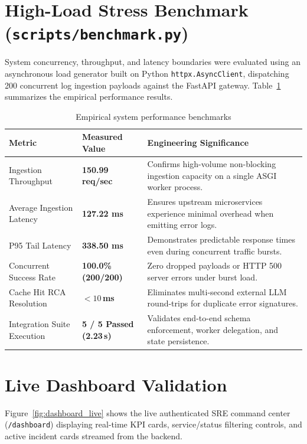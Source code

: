 \documentclass[12pt,a4paper,oneside]{report}
\begin{document}
\section{High-Load Stress Benchmark (\texttt{scripts/benchmark.py})}
System concurrency, throughput, and latency boundaries were evaluated using an asynchronous load generator built on Python \texttt{httpx.AsyncClient}, dispatching 200 concurrent log ingestion payloads against the FastAPI gateway. Table~\ref{tab:benchmarks} summarizes the empirical performance results.

\begin{table}[H]
\centering\small\singlespacing
\caption{Empirical system performance benchmarks}\label{tab:benchmarks}
\begin{tabularx}{\linewidth}{@{}l l X@{}}
\toprule
\textbf{Metric} & \textbf{Measured Value} & \textbf{Engineering Significance}\\
\midrule
Ingestion Throughput & \textbf{150.99 req/sec} & Confirms high-volume non-blocking ingestion capacity on a single ASGI worker process.\\
Average Ingestion Latency & \textbf{127.22 ms} & Ensures upstream microservices experience minimal overhead when emitting error logs.\\
P95 Tail Latency & \textbf{338.50 ms} & Demonstrates predictable response times even during concurrent traffic bursts.\\
Concurrent Success Rate & \textbf{100.0\% (200/200)} & Zero dropped payloads or HTTP 500 server errors under burst load.\\
Cache Hit RCA Resolution & \textbf{$< 10$\,ms} & Eliminates multi-second external LLM round-trips for duplicate error signatures.\\
Integration Suite Execution & \textbf{5 / 5 Passed (2.23\,s)} & Validates end-to-end schema enforcement, worker delegation, and state persistence.\\
\bottomrule
\end{tabularx}
\end{table}

\section{Live Dashboard Validation}
Figure~\ref{fig:dashboard_live} shows the live authenticated SRE command center (\texttt{/dashboard}) displaying real-time KPI cards, service/status filtering controls, and active incident cards streamed from the backend.
\end{document}
